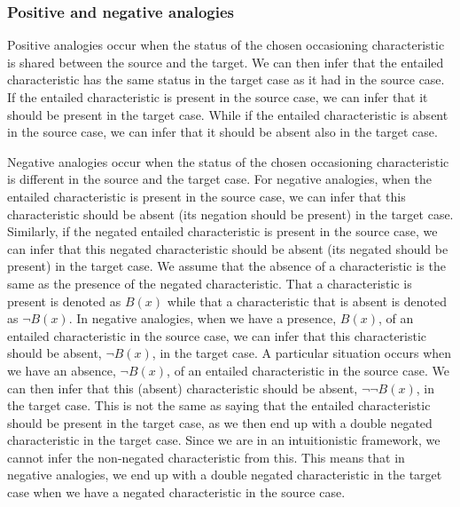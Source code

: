 		
		\subsubsection{Positive and negative analogies}
		
		Positive analogies occur when the status of the chosen occasioning characteristic is shared between the source and the target. We can then infer that the entailed characteristic has the same status in the target case as it had in the source case. If the entailed characteristic is present in the source case, we can infer that it should be present in the target case. While if the entailed characteristic is absent in the source case, we can infer that it should be absent also in the target case. 
		
		Negative analogies occur when the status of the chosen occasioning characteristic is different in the source and the target case. For negative analogies, when the entailed characteristic is present in the source case, we can infer that this characteristic should be absent (its negation should be present) in the target case. Similarly, if the negated entailed characteristic is present in the source case, we can infer that this negated characteristic should be absent (its negated should be present) in the target case. We assume that the absence of a characteristic is the same as the presence of the negated characteristic. That a characteristic is present is denoted as $B(x)$ while that a characteristic that is absent is denoted as $\neg B(x)$. In negative analogies, when we have a presence, $B(x)$, of an entailed characteristic in the source case, we can infer that this characteristic should be absent, $\neg B(x)$, in the target case. A particular situation occurs when we have an absence, $\neg B(x)$, of an entailed characteristic in the source case. We can then infer that this (absent) characteristic should be absent, $\neg \neg B(x)$, in the target case. This is not the same as saying that the entailed characteristic should be present in the target case, as we then end up with a double negated characteristic in the target case. Since we are in an intuitionistic framework, we cannot infer the non-negated characteristic from this. This means that in negative analogies, we end up with a double negated characteristic in the target case when we have a negated characteristic in the source case.
		
